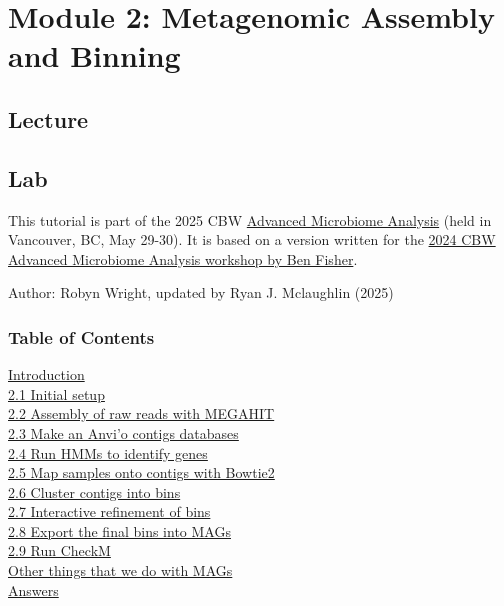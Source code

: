 \documentclass[
]{book}
\begin{document}
\chapter{Module 2: Metagenomic Assembly and Binning}\label{module-2-metagenomic-assembly-and-binning}

\section{Lecture}\label{lecture-1}

\section{Lab}\label{lab}

This tutorial is part of the 2025 CBW \href{https://bioinformaticsdotca.github.io/AMB_2025/}{Advanced Microbiome Analysis} (held in Vancouver, BC, May 29-30). It is based on a version written for the \href{https://bioinformaticsdotca.github.io/AMB_2024_module1}{2024 CBW Advanced Microbiome Analysis workshop by Ben Fisher}.

Author: Robyn Wright, updated by Ryan J. Mclaughlin (2025)

\subsection{Table of Contents}\label{table-of-contents}

\hyperref[introduction]{Introduction}\\
\hyperref[21-initial-setup]{2.1 Initial setup}\\
\hyperref[22-assembly-of-raw-reads-with-megahit]{2.2 Assembly of raw reads with MEGAHIT}\\
\hyperref[23-make-an-anvio-contigs-databases]{2.3 Make an Anvi'o contigs databases}\\
\hyperref[24-run-hmms-to-identify-single-copy-genes]{2.4 Run HMMs to identify genes}\\
\hyperref[25-map-samples-onto-contigs-with-bowtie2]{2.5 Map samples onto contigs with Bowtie2}\\
\hyperref[26-cluster-contigs-into-bins]{2.6 Cluster contigs into bins}\\
\hyperref[27-interactive-refinement-of-bins]{2.7 Interactive refinement of bins}\\
\hyperref[28-export-the-final-bins-into-mags]{2.8 Export the final bins into MAGs}\\
\hyperref[29-run-checkm]{2.9 Run CheckM}\\
\hyperref[other-things-that-we-frequently-do-with-mags]{Other things that we do with MAGs}\\
\hyperref[answers]{Answers}
\end{document}
